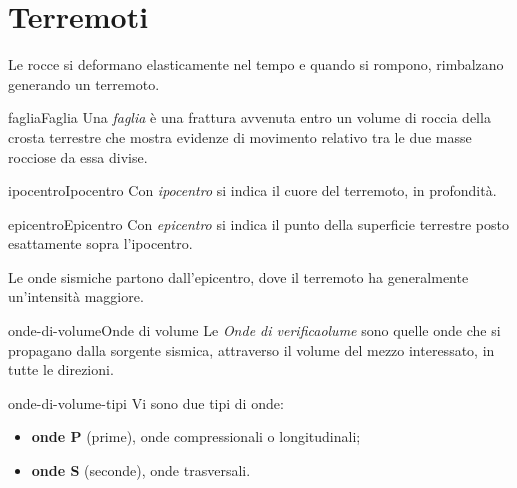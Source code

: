 \documentclass[preview]{standalone}
\begin{document}
\genpage


\section{Terremoti}

\begin{plainhtml}
    Le rocce si deformano elasticamente nel tempo e quando si rompono,
    rimbalzano generando un terremoto.
\end{plainhtml}

\begin{snippetdefinition}{faglia}{Faglia}
    Una \textit{faglia} è una frattura avvenuta entro
    un volume di roccia della crosta terrestre che mostra evidenze di
    movimento relativo tra le due masse rocciose da essa divise.
\end{snippetdefinition}

\begin{snippetdefinition}{ipocentro}{Ipocentro}
    Con \textit{ipocentro} si indica il cuore del terremoto, in profondità.
\end{snippetdefinition}

\begin{snippetdefinition}{epicentro}{Epicentro}
    Con \textit{epicentro} si indica il punto della superficie terrestre posto esattamente sopra l'ipocentro.
\end{snippetdefinition}

\begin{plainhtml}
    Le onde sismiche partono dall'epicentro, dove il terremoto ha generalmente un'intensità maggiore.
\end{plainhtml}

\begin{snippetdefinition}{onde-di-volume}{Onde di volume}
    Le \textit{Onde di verificaolume} sono quelle onde che si propagano dalla sorgente sismica,
    attraverso il volume del mezzo interessato, in tutte le direzioni.
\end{snippetdefinition}

\begin{snippet}{onde-di-volume-tipi}
    Vi sono due tipi di onde:
    \begin{itemize}
        \item \textbf{onde P} (prime), onde compressionali o longitudinali;
        \item \textbf{onde S} (seconde), onde trasversali.
    \end{itemize}
\end{snippet}
\end{document}
